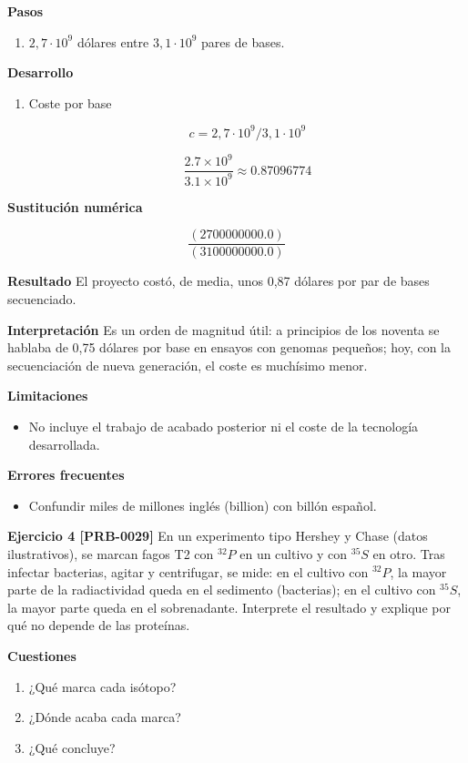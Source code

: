 \documentclass{book}
\begin{document}
\noindent\textbf{Pasos}
\begin{enumerate}
\item
\(2,7\cdot10^{9}\) dólares entre \(3,1\cdot10^{9}\) pares de bases.

\end{enumerate}

\noindent\textbf{Desarrollo}
\begin{enumerate}
\item
Coste por base


\[
c = 2{,}7\cdot 10^9/3{,}1\cdot 10^9
\]

\[
\frac{2.7\times 10^{9}}{3.1\times 10^{9}} \approx 0.87096774
\]
\end{enumerate}

\noindent\textbf{Sustitución numérica}

\[
\frac{\left(2700000000.0\right)}{\left(3100000000.0\right)}
\]

\noindent\textbf{Resultado}
El proyecto costó, de media, unos 0,87 dólares por par de bases secuenciado.


\noindent\textbf{Interpretación}
Es un orden de magnitud útil: a principios de los noventa se hablaba de 0,75 dólares por base en ensayos con genomas pequeños; hoy, con la secuenciación de nueva generación, el coste es muchísimo menor.


\noindent\textbf{Limitaciones}
\begin{itemize}
\item No incluye el trabajo de acabado posterior ni el coste de la tecnología desarrollada.
\end{itemize}

\noindent\textbf{Errores frecuentes}
\begin{itemize}
\item Confundir miles de millones inglés (billion) con billón español.
\end{itemize}

\noindent\textbf{Ejercicio 4 [PRB-0029]}
En un experimento tipo Hershey y Chase (datos ilustrativos), se marcan fagos T2 con \({}^{32}P\) en un cultivo y con \({}^{35}S\) en otro. Tras infectar bacterias, agitar y centrifugar, se mide: en el cultivo con \({}^{32}P\), la mayor parte de la radiactividad queda en el sedimento (bacterias); en el cultivo con \({}^{35}S\), la mayor parte queda en el sobrenadante. Interprete el resultado y explique por qué no depende de las proteínas.


\noindent\textbf{Cuestiones}
\begin{enumerate}
\item ¿Qué marca cada isótopo?
\item ¿Dónde acaba cada marca?
\item ¿Qué concluye?
\end{enumerate}
\end{document}
